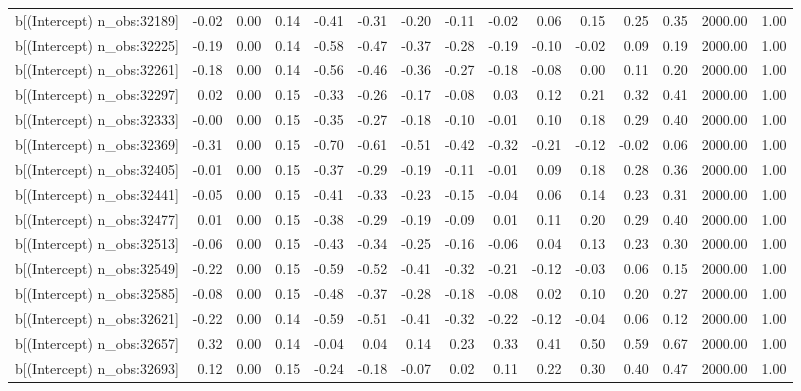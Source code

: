 \begin{table}[ht]
\begin{tabular}{rrrrrrrrrrrrrrr}
  b[(Intercept) n\_obs:32189] & -0.02 & 0.00 & 0.14 & -0.41 & -0.31 & -0.20 & -0.11 & -0.02 & 0.06 & 0.15 & 0.25 & 0.35 & 2000.00 & 1.00 \\ 
  b[(Intercept) n\_obs:32225] & -0.19 & 0.00 & 0.14 & -0.58 & -0.47 & -0.37 & -0.28 & -0.19 & -0.10 & -0.02 & 0.09 & 0.19 & 2000.00 & 1.00 \\ 
  b[(Intercept) n\_obs:32261] & -0.18 & 0.00 & 0.14 & -0.56 & -0.46 & -0.36 & -0.27 & -0.18 & -0.08 & 0.00 & 0.11 & 0.20 & 2000.00 & 1.00 \\ 
  b[(Intercept) n\_obs:32297] & 0.02 & 0.00 & 0.15 & -0.33 & -0.26 & -0.17 & -0.08 & 0.03 & 0.12 & 0.21 & 0.32 & 0.41 & 2000.00 & 1.00 \\ 
  b[(Intercept) n\_obs:32333] & -0.00 & 0.00 & 0.15 & -0.35 & -0.27 & -0.18 & -0.10 & -0.01 & 0.10 & 0.18 & 0.29 & 0.40 & 2000.00 & 1.00 \\ 
  b[(Intercept) n\_obs:32369] & -0.31 & 0.00 & 0.15 & -0.70 & -0.61 & -0.51 & -0.42 & -0.32 & -0.21 & -0.12 & -0.02 & 0.06 & 2000.00 & 1.00 \\ 
  b[(Intercept) n\_obs:32405] & -0.01 & 0.00 & 0.15 & -0.37 & -0.29 & -0.19 & -0.11 & -0.01 & 0.09 & 0.18 & 0.28 & 0.36 & 2000.00 & 1.00 \\ 
  b[(Intercept) n\_obs:32441] & -0.05 & 0.00 & 0.15 & -0.41 & -0.33 & -0.23 & -0.15 & -0.04 & 0.06 & 0.14 & 0.23 & 0.31 & 2000.00 & 1.00 \\ 
  b[(Intercept) n\_obs:32477] & 0.01 & 0.00 & 0.15 & -0.38 & -0.29 & -0.19 & -0.09 & 0.01 & 0.11 & 0.20 & 0.29 & 0.40 & 2000.00 & 1.00 \\ 
  b[(Intercept) n\_obs:32513] & -0.06 & 0.00 & 0.15 & -0.43 & -0.34 & -0.25 & -0.16 & -0.06 & 0.04 & 0.13 & 0.23 & 0.30 & 2000.00 & 1.00 \\ 
  b[(Intercept) n\_obs:32549] & -0.22 & 0.00 & 0.15 & -0.59 & -0.52 & -0.41 & -0.32 & -0.21 & -0.12 & -0.03 & 0.06 & 0.15 & 2000.00 & 1.00 \\ 
  b[(Intercept) n\_obs:32585] & -0.08 & 0.00 & 0.15 & -0.48 & -0.37 & -0.28 & -0.18 & -0.08 & 0.02 & 0.10 & 0.20 & 0.27 & 2000.00 & 1.00 \\ 
  b[(Intercept) n\_obs:32621] & -0.22 & 0.00 & 0.14 & -0.59 & -0.51 & -0.41 & -0.32 & -0.22 & -0.12 & -0.04 & 0.06 & 0.12 & 2000.00 & 1.00 \\ 
  b[(Intercept) n\_obs:32657] & 0.32 & 0.00 & 0.14 & -0.04 & 0.04 & 0.14 & 0.23 & 0.33 & 0.41 & 0.50 & 0.59 & 0.67 & 2000.00 & 1.00 \\ 
  b[(Intercept) n\_obs:32693] & 0.12 & 0.00 & 0.15 & -0.24 & -0.18 & -0.07 & 0.02 & 0.11 & 0.22 & 0.30 & 0.40 & 0.47 & 2000.00 & 1.00 \\ 

\end{tabular}
\end{table}
